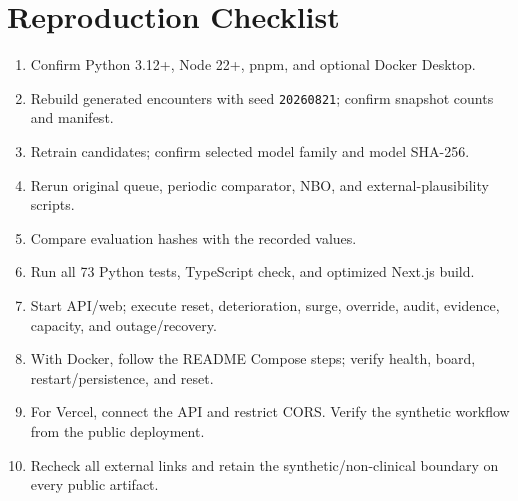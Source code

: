 \documentclass[11pt,a4paper]{article}
\newcommand{\code}[1]{\nolinkurl{#1}}
\begin{document}
\section{Reproduction Checklist}

\begin{enumerate}
  \item Confirm Python 3.12+, Node 22+, pnpm, and optional Docker Desktop.
  \item Rebuild generated encounters with seed \code{20260821}; confirm snapshot counts and manifest.
  \item Retrain candidates; confirm selected model family and model SHA-256.
  \item Rerun original queue, periodic comparator, NBO, and external-plausibility scripts.
  \item Compare evaluation hashes with the recorded values.
  \item Run all 73 Python tests, TypeScript check, and optimized Next.js build.
  \item Start API/web; execute reset, deterioration, surge, override, audit, evidence, capacity, and outage/recovery.
  \item With Docker, follow the README Compose steps; verify health, board, restart/persistence, and reset.
  \item For Vercel, connect the API and restrict CORS. Verify the synthetic workflow from the public deployment.
  \item Recheck all external links and retain the synthetic/non-clinical boundary on every public artifact.
\end{enumerate}
\end{document}
